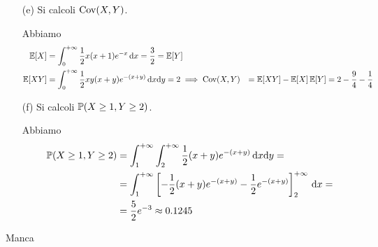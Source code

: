 \begin{enumerate}
\item [(e)] Si calcoli $\operatorname{Cov}(X,Y)$.

Abbiamo
\begin{gather*}
\begin{aligned}
\mathbb{E}[X]&=\int_{0}^{+\infty} \frac{1}{2}x(x+1)e^{-x}\, \mathrm{d} x=\frac{3}{2}=\mathbb{E}[Y] \\
\mathbb{E}[XY]&=\int_{0}^{+\infty} \frac{1}{2}xy(x+y)e^{-(x+y)}\, \mathrm{d} x \mathrm{d} y=2
\implies \operatorname{Cov}(X,Y)&=\mathbb{E}[XY]-\mathbb{E}[X]\,\mathbb{E}[Y]=2-\frac{9}{4}-\frac{1}{4}
\end{aligned}
\end{gather*}

\item [(f)] Si calcoli $\mathbb{P}(X\geq 1,Y\geq 2)$.

Abbiamo
\begin{gather*}
\begin{aligned}
\mathbb{P}(X\geq 1,Y\geq 2)&=\int_1^{+\infty}\int_2^{+\infty} \frac{1}{2}(x+y)e^{-(x+y)}\, \mathrm{d} x \mathrm{d} y=\\
&=\int_1^{+\infty}\left[-\frac{1}{2}(x+y)e^{-(x+y)}-\frac{1}{2}e^{-(x+y)}  \right]_2^{+\infty}\, \mathrm{d} x=\\
&=\frac{5}{2}e^{-3}\approx 0.1245
\end{aligned}
\end{gather*}

\end{enumerate}

\Soluzione{}
Manca

